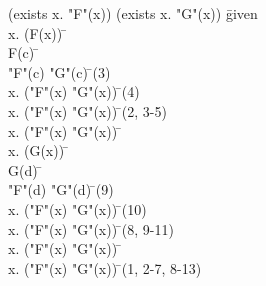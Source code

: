 \documentclass{article}
\begin{document}
\begin{proofbox}
\: (exists x. "F"(x)) \lor (exists x. "G"(x)) \= \hbox{given} \\
\openAlt
\: \exists x. (F(x)) \= \asm \\
\open
\: F(c) \= \asm \\
\: "F"(c) \lor "G"(c) \= \orintro(3) \\
\: \exists x. ("F"(x) \lor "G"(x)) \= \existsintro(4) \\
\close
\: \exists x. ("F"(x) \lor "G"(x)) \= \existselim(2, 3-5) \\
\: \exists x. ("F"(x) \lor "G"(x)) \=  \\
\splitAlt
\: \exists x. (G(x)) \= \asm \\
\open
\: G(d) \= \asm \\
\: "F"(d) \lor "G"(d) \= \orintro(9) \\
\: \exists x. ("F"(x) \lor "G"(x)) \= \existsintro(10) \\
\close
\: \exists x. ("F"(x) \lor "G"(x)) \= \existselim(8, 9-11) \\
\: \exists x. ("F"(x) \lor "G"(x)) \=  \\
\closeAlt
\: \exists x. ("F"(x) \lor "G"(x)) \= \orelim(1, 2-7, 8-13) \\
\end{proofbox}
\end{document}
